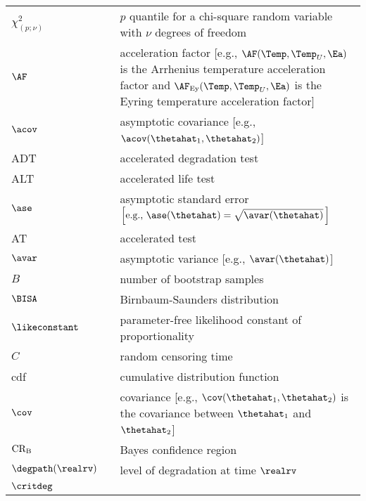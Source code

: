 \begin{supertabular}{p{0.9in}lp{4.0in}}
$\chi^{2}_{(p;\nu)}$      & 
&$p$ quantile for a chi-square random variable with
$\nu$ degrees of freedom
  \\
$\AF$  &
&acceleration factor [e.g., $\AF(\Temp,\Temp_{U},\Ea)$ is 
the Arrhenius temperature acceleration factor and 
$\AF_{\rm Ey}(\Temp,\Temp_{U},\Ea)$ is
the Eyring temperature acceleration factor]
   \\
$\acov$  &
&asymptotic covariance [e.g., $\acov(\thetahat_{1},
\thetahat_{2})$] 
 \\
ADT  &
& accelerated degradation test
 \\
ALT  &
& accelerated life test
  \\
$\ase$  &
&asymptotic standard error
$ \left [ \mbox{e.g.,} \,\, \ase(\thetahat)=\sqrt{\avar(\thetahat)} \, \right ] $
  \\
AT  &
& accelerated test
  \\
$\avar$  &
&asymptotic variance [e.g., $\avar(\thetahat)$] 
    \\
$B$ &
&number of bootstrap samples
   \\
$\BISA$     & 
&Birnbaum-Saunders distribution
  \\
${\likeconstant}$ &
&parameter-free likelihood constant of proportionality
  \\
$C$     & 
&random censoring time
   \\
cdf & 
& cumulative distribution function
   \\
${\cov}$ &
&covariance [e.g., $\cov(\thetahat_{1},\thetahat_{2})$ is
the covariance between $\thetahat_{1}$ and  $\thetahat_{2}$]
   \\
$\mbox{CR}_{\rm B}$ &
&
Bayes confidence region
  \\
$\degpath(\realrv)$ &
&level of degradation at time $\realrv$
   \\
$\critdeg$ &

\end{supertabular}
